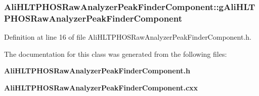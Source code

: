 \subsubsection{ {\bf Ali\-HLTPHOSRaw\-Analyzer\-Peak\-Finder\-Component::g\-Ali\-HLTPHOSRaw\-Analyzer\-Peak\-Finder\-Component}\hspace{0.3cm}{\tt  [static]}}\label{classAliHLTPHOSRawAnalyzerPeakFinderComponent_AliHLTPHOSRawAnalyzerPeakFinderComponents0}




Definition at line 16 of file Ali\-HLTPHOSRaw\-Analyzer\-Peak\-Finder\-Component.h.

The documentation for this class was generated from the following files:\begin{CompactItemize}
\item 
{\bf Ali\-HLTPHOSRaw\-Analyzer\-Peak\-Finder\-Component.h}\item 
{\bf Ali\-HLTPHOSRaw\-Analyzer\-Peak\-Finder\-Component.cxx}\end{CompactItemize}
